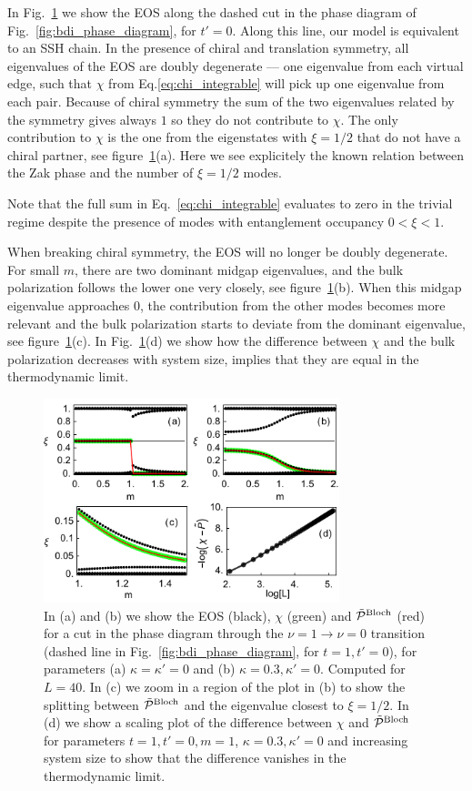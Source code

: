 \documentclass[twocolumn,amsmath,longbibliography,amssymb,superscriptaddress]{revtex4-1}
\newcommand{\carlos}[1]{{\color{red} #1}}
\begin{document}
In Fig.~\ref{huang} we show  the EOS along the dashed cut in the phase diagram of Fig.~\ref{fig:bdi_phase_diagram}, for $t'=0$. 
Along this line, our model is equivalent to an SSH chain. 
In the presence of chiral and translation symmetry, all eigenvalues of the EOS are doubly degenerate --- one eigenvalue from each virtual edge, such that $\chi$ from Eq.\eqref{eq:chi_integrable} will pick up one eigenvalue from each pair. Because of chiral symmetry the sum of the two eigenvalues related by the symmetry gives always $1$ so they do not contribute to $\chi$. The only contribution to $\chi$ is the one from the eigenstates with $\xi=1/2$ that do not have a chiral partner, see figure~\ref{huang}(a). Here we see explicitely the known relation between the Zak phase and the number of $\xi = 1/2$ modes.

Note that the full sum  in Eq.~\eqref{eq:chi_integrable}  evaluates to zero in the trivial regime %
despite the presence of modes with entanglement occupancy $0<\xi<1$. 

When breaking chiral symmetry, the EOS will no longer be doubly degenerate. 
For small $m$, there are two dominant midgap eigenvalues, and the bulk polarization follows the lower one very closely, see figure~\ref{huang}(b).
When this midgap eigenvalue approaches  0, the contribution from the other modes becomes more relevant and the bulk polarization starts to deviate from the dominant eigenvalue, see figure~\ref{huang}(c). In Fig.~\ref{huang}(d) we show how the difference between $\chi$ and the bulk polarization decreases with system size, implies that they are equal in the thermodynamic limit. 


\begin{figure}[t]
\centering
\includegraphics[width=86mm]{fig3comp.pdf}
\caption{In (a) and (b)  we show the EOS (black), $\chi$ (green) and $\tilde{\mathcal{P}}^{\rm Bloch}$ (red) for a cut in the phase diagram through the $\nu = 1 \rightarrow \nu = 0$ transition (dashed line in Fig.~\ref{fig:bdi_phase_diagram}, for $t = 1,t'=0$), for parameters  (a) $\kappa =\kappa'=0$ and (b) $\kappa = 0.3, \kappa'=0$. Computed for $L=40$. In (c) we zoom in a region of the plot in (b) to show the splitting between $\tilde{\mathcal{P}}^{\rm Bloch}$ and the eigenvalue closest to $\xi=1/2$. In (d) we show a scaling plot of the difference between $\chi$ and $\tilde{\mathcal{P}}^{\rm Bloch}$ for parameters $t=1,t'=0,m=1$, $\kappa = 0.3, \kappa'=0$ and increasing system size to show that the difference vanishes in the thermodynamic limit. }
\label{huang}
\end{figure}
\end{document}
